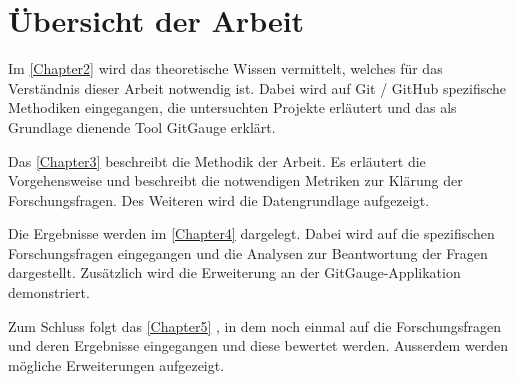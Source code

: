






\section{Übersicht der Arbeit}
Im \autoref{Chapter2} \textit{} wird das theoretische Wissen vermittelt, welches für das Verständnis dieser Arbeit notwendig ist. Dabei wird auf  Git / GitHub spezifische Methodiken eingegangen, die untersuchten Projekte erläutert und das als Grundlage dienende Tool GitGauge erklärt.

Das \autoref{Chapter3} \textit{} beschreibt die Methodik der Arbeit. Es erläutert die Vorgehensweise und beschreibt die notwendigen Metriken zur Klärung der Forschungsfragen. Des Weiteren wird die Datengrundlage aufgezeigt.


Die Ergebnisse werden im \autoref{Chapter4} \textit{} dargelegt. Dabei wird auf die spezifischen Forschungsfragen eingegangen und die Analysen zur Beantwortung der Fragen dargestellt. Zusätzlich wird die Erweiterung an der GitGauge-Applikation demonstriert.

Zum Schluss folgt das \autoref{Chapter5} \textit{}, in dem noch einmal auf die Forschungsfragen und deren Ergebnisse eingegangen und diese bewertet werden. Ausserdem werden mögliche Erweiterungen aufgezeigt.





